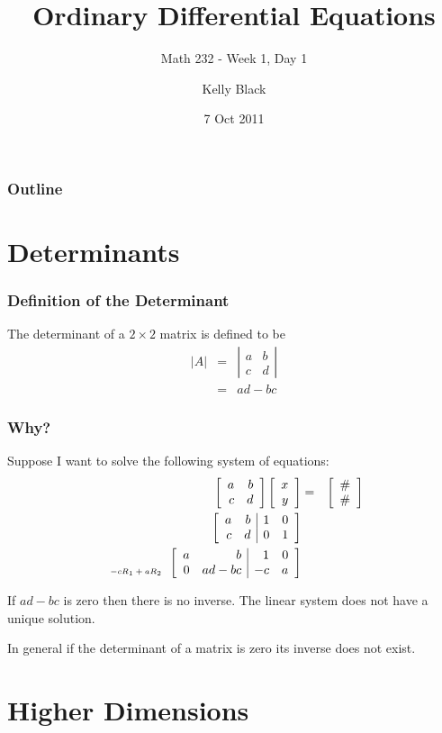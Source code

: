 \documentclass{beamer}
\newcommand{\arrayTwo}[4]{
  \left[
  \begin{array}{rr}
    #1 & #2 \\
    #3 & #4
  \end{array}
  \right]
}
\newcommand{\detTwo}[4]{
  \left|
  \begin{array}{rr}
    #1 & #2 \\
    #3 & #4
  \end{array}
  \right|
}
\newcommand{\vecTwo}[2]{
  \left[
  \begin{array}{r}
    #1 \\  #2
  \end{array}
  \right]
}
\newcommand{\stateTwo}[2]{
  \begin{array}{rr}
    \mbox{\fontsize{6}{6}\selectfont $#1$} \\  \mbox{\fontsize{6}{6}\selectfont $#2$}
  \end{array}
}
\newcommand{\startRowOpsTwo}{
  \left[
    \begin{array}{rr|rr}
}
\newcommand{\oneRowOpsTwo}[4] {
      #1 & #2 & #3 & #4 \\
}
\newcommand{\stopRowOps}{
    \end{array}
  \right]
}
\begin{document}
\title{Ordinary Differential Equations}
\subtitle{Math 232 - Week 1, Day 1}

\author{Kelly Black}
\date{7 Oct 2011}

\begin{frame}
  \titlepage
\end{frame}

\begin{frame}
  \frametitle{Outline}
\end{frame}


\section{Determinants}


\begin{frame}
  \frametitle{Definition of the Determinant}

  The determinant of a $2\times 2$ matrix is defined to be
  \begin{eqnarray*}
    |A| & = & \detTwo{a}{b}{c}{d} \\
    & = & ad - bc
  \end{eqnarray*}

\end{frame}


\begin{frame}
  \frametitle{Why?}

  Suppose I want to solve the following system of equations:
  \begin{eqnarray*}
    \arrayTwo{a}{b}{c}{d} \vecTwo{x}{y} & = & \vecTwo{\#}{\#} \\
    \startRowOpsTwo
    \oneRowOpsTwo{a}{b}{1}{0}
    \oneRowOpsTwo{c}{d}{0}{1}
    \stopRowOps \\
    \stateTwo{}{-cR_1+aR_2}
    \startRowOpsTwo
    \oneRowOpsTwo{a}{b}{1}{0}
    \oneRowOpsTwo{0}{ad-bc}{-c}{a}
    \stopRowOps
  \end{eqnarray*}

  {
    If $ad-bc$ is zero then there is no inverse. The linear system
    does not have a unique solution.
  }

  {
    In general if the determinant of a matrix is zero its inverse does
    not exist. 
  }

\end{frame}


\section{Higher Dimensions}
\end{document}

